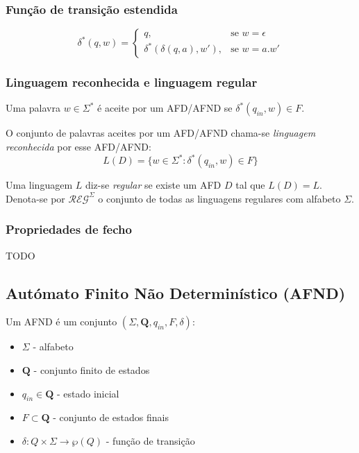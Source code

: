 \documentclass{article}
\begin{document}
\subsubsection{Função de transição estendida}

$$\delta^*(q,w) = \begin{cases}
        q,                        & \text{se } w = \epsilon \\
        \delta^*(\delta(q,a),w'), & \text{se } w = a.w'
    \end{cases}$$

\subsubsection{Linguagem reconhecida e linguagem regular}

Uma palavra $w \in \Sigma^*$ é aceite por um AFD/AFND se $\delta^*(q_{in}, w) \in F$.

\noindent O conjunto de palavras aceites por um AFD/AFND chama-se \emph{linguagem reconhecida} por esse AFD/AFND:
$$L(D) = \{w \in \Sigma^* : \delta^*(q_{in}, w) \in F \}$$

\noindent Uma linguagem $L$ diz-se \emph{regular} se existe um AFD $D$ tal que $L(D) = L$. Denota-se por $\mathcal{REG}^\Sigma$ o conjunto de todas as linguagens regulares com alfabeto $\Sigma$.

\subsubsection{Propriedades de fecho}

TODO

\subsection{Autómato Finito Não Determinístico (AFND)}

Um AFND é um conjunto $(\Sigma, \mathbf{Q}, q_{in}, F, \delta)$:

\begin{itemize}
    \item $\Sigma$ - alfabeto
    \item $\mathbf{Q}$ - conjunto finito de estados
    \item $q_{in} \in \mathbf{Q}$ - estado inicial
    \item $F \subset \mathbf{Q}$ - conjunto de estados finais
    \item $\delta : Q \times \Sigma \to \wp(Q)$ - função de transição
\end{itemize}
\end{document}
